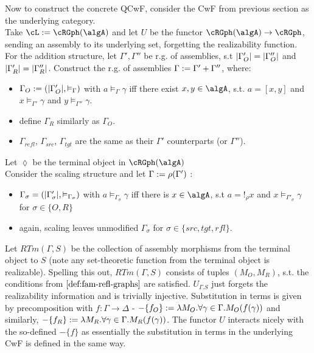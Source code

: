 \documentclass[12pt,a4paper]{article}
\def\src{_{src}}\alwaysmath{src}
\def\rfl{_{refl}}\alwaysmath{rfl}
\def\tgt{_{tgt}}\alwaysmath{tgt}
\renewcommand{\O}{_{O}}\alwaysmath{O}
\def\R{_{R}}\alwaysmath{R}
\begin{document}
Now to construct the concrete QCwF, consider the CwF from previous section as the underlying category.\\
Take $\cL := \cRGph(\algA)$ and let $U$ be the functor $\cRGph(\algA) \to \cRGph$, sending an assembly to its underlying set, forgetting the realizability function.\\
For the addition structure, let $\Gamma', \Gamma''$ be r.g. of assemblies, s.t  $\carr{\Gamma'\O}=\carr{\Gamma''\O}$ and $\carr{\Gamma'\R}=\carr{\Gamma''\R}$. Construct the r.g. of assemblies $\Gamma := \Gamma' + \Gamma''$, where:
\begin{itemize}[noitemsep]
    \item $\Gamma\O \define (\carr{\Gamma'\O}, \vDash_\Gamma)$ with $ a \vDash_\Gamma \gamma$ iff there exist $x,y \in \algA$, s.t. $a = [x,y]$ and $x \vDash_{\Gamma'} \gamma$ and $ y \vDash_{\Gamma''} \gamma$.

    \item define $\Gamma\R$ similarly as $\Gamma\O$.

    \item $\Gamma\rfl$, $\Gamma\src$, $\Gamma\tgt$ are the same as their $\Gamma'$ counterparts (or $\Gamma''$).\\
\end{itemize}
Let $\lozenge$ be the terminal object in $\cRGph(\algA)$\\
Consider the scaling structure and let $\Gamma := \rho(\Gamma')$ :
  \begin{itemize}
    \item $\Gamma_\sigma = (|\Gamma'_\sigma|, \vDash_{\Gamma_\sigma})$ with $a \vDash_{\Gamma_\sigma} \gamma$ iff there is $x \in \algA$, s.t $a = !_\rho x$ and $x \vDash_{\Gamma'_\sigma} \gamma$ for $\sigma \in \{O, R\}$
    
    \item again, scaling leaves unmodified $\Gamma_\sigma$ for $\sigma\in\{src,tgt,rfl\}$.
\end{itemize}
Let $RTm(\Gamma, S)$ be the collection of assembly morphisms from the terminal object to $S$ (note any set-theoretic function from the terminal object is realizable). Spelling this out, $RTm(\Gamma, S)$ consists of tuples $(M\O, M\R)$, s.t. the conditions from $\cref{def:fam-refl-graphs}$ are satisfied. $U_{\Gamma.S}$ just forgets the realizability information and is trivially injective. Substitution in terms is given by precomposition with $f : \Gamma \to \Delta$ - $-\{f\O\} \define \lambda M\O. \forall \gamma \in \Gamma . M\O(f(\gamma))$ and similarly, $-\{f\R\} \define \lambda M\R . \forall \gamma \in \Gamma . M\R(f(\gamma))$. The functor $U$ interacts nicely with the so-defined $-\{f\}$ as essentially the substitution in terms in the underlying CwF is defined in the same way.\\
\end{document}
